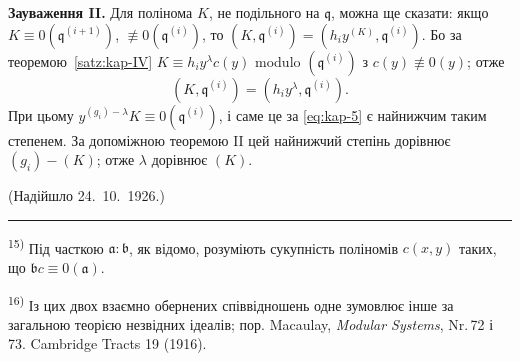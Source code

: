 \documentclass[11pt]{article}
\newcommand{\foreign}[1]{#1}
\theoremstyle{plain}
\begin{document}
\textbf{Зауваження II.} Для полінома $K$, не подільного на
$\mathfrak{q}$, можна ще сказати: якщо
$K \equiv 0(\mathfrak{q}^{(i+1)})$,
$\not\equiv 0(\mathfrak{q}^{(i)})$, то
$(K, \mathfrak{q}^{(i)}) = (h_{i}y^{(K)}, \mathfrak{q}^{(i)})$.
Бо за теоремою~\ref{satz:kap-IV}
$K \equiv h_{i}y^{\lambda}c(y)$ modulo
$(\mathfrak{q}^{(i)})$ з $c(y) \not\equiv 0(y)$; отже
\[
(K, \mathfrak{q}^{(i)}) = (h_{i}y^{\lambda}, \mathfrak{q}^{(i)}).
\]
При цьому $y^{(g_{i})-\lambda}K \equiv 0(\mathfrak{q}^{(i)})$, і саме це
за \eqref{eq:kap-5} є найнижчим таким степенем. За допоміжною
теоремою II цей найнижчий степінь дорівнює $(g_{i}) - (K)$; отже
$\lambda$ дорівнює $(K)$.

\vfill
\begin{flushright}
(Надійшло 24.\ 10.\ 1926.)
\end{flushright}

\vspace{0.5em}
\noindent\rule{\textwidth}{0.4pt}
\vspace{0.3em}

{\footnotesize
\textsuperscript{15)} Під часткою $\mathfrak{a}:\mathfrak{b}$, як відомо,
розуміють сукупність поліномів $c(x,y)$ таких, що
$\mathfrak{b}c \equiv 0(\mathfrak{a})$.

\textsuperscript{16)} Із цих двох взаємно обернених співвідношень одне
зумовлює інше за загальною теорією незвідних ідеалів; пор.
Macaulay, \textit{Modular Systems}, Nr.\,72 і 73.
\foreign{Cambridge Tracts} 19 (1916).
}
\end{document}

